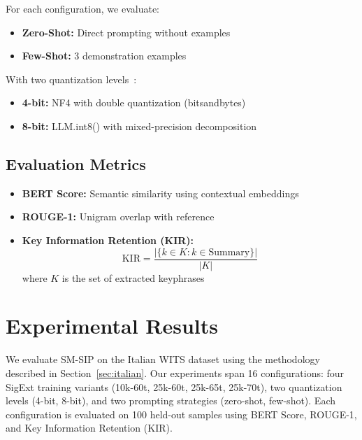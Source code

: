 \documentclass[conference]{IEEEtran}
\begin{document}
For each configuration, we evaluate:
\begin{itemize}
    \item \textbf{Zero-Shot:} Direct prompting without examples

    
    \item \textbf{Few-Shot:} 3 demonstration examples
\end{itemize}

With two quantization levels~\cite{dettmers2022llm}:
\begin{itemize}
    \item \textbf{4-bit:} NF4 with double quantization (bitsandbytes)
    \item \textbf{8-bit:} LLM.int8() with mixed-precision decomposition
\end{itemize}

\subsection{Evaluation Metrics}

\begin{itemize}
    \item \textbf{BERT Score:} Semantic similarity using contextual embeddings
    \item \textbf{ROUGE-1:} Unigram overlap with reference
    \item \textbf{Key Information Retention (KIR):}
    \begin{equation}
    \text{KIR} = \frac{|\{k \in K : k \in \text{Summary}\}|}{|K|}
    \label{eq:kir}
    \end{equation}
    where $K$ is the set of extracted keyphrases
\end{itemize}

\section{Experimental Results}

We evaluate SM-SIP on the Italian WITS dataset using the methodology described in Section~\ref{sec:italian}. Our experiments span 16 configurations: four SigExt training variants (10k-60t, 25k-60t, 25k-65t, 25k-70t), two quantization levels (4-bit, 8-bit), and two prompting strategies (zero-shot, few-shot). Each configuration is evaluated on 100 held-out samples using BERT Score, ROUGE-1, and Key Information Retention (KIR).
\end{document}
